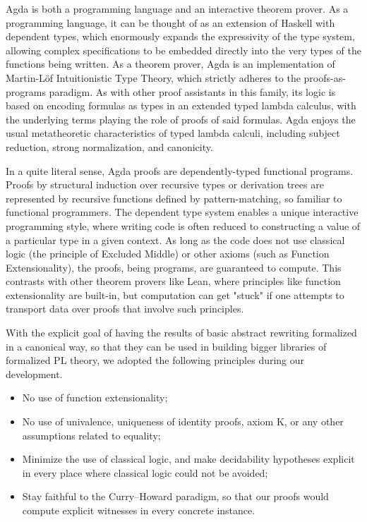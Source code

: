 Agda is both a programming language and an interactive theorem prover.
As a programming language, it can be thought of as an extension of Haskell
with dependent types, which enormously expands the expressivity of the type system,
allowing complex specifications to be embedded directly into the
very types of the functions being written.
As a theorem prover, Agda is an implementation of Martin-L\"of
Intuitionistic Type Theory, which strictly adheres to the proofs-as-programs paradigm.
As with other proof assistants in this family, its logic is based on encoding
formulas as types in an extended typed lambda calculus, with the underlying terms
playing the role of proofs of said formulas. Agda enjoys the usual metatheoretic characteristics
of typed lambda calculi, including subject reduction, strong normalization, and canonicity.

In a quite literal sense, Agda proofs are dependently-typed functional programs.
Proofs by structural induction over recursive types or derivation trees are represented by
recursive functions defined by pattern-matching, so familiar to functional programmers.
The dependent type system enables a unique interactive programming style, where
writing code is often reduced to constructing a value of a particular type in a given context. As long as the code does not use classical logic (the principle of Excluded Middle) or
other axioms (such as Function Extensionality), the proofs, being programs,
are guaranteed to compute. %
This contrasts with other theorem provers like Lean, where principles like function extensionality are built-in, but computation can get "stuck" if one attempts to transport data over proofs that involve such principles.

With the explicit goal of having the results of basic abstract rewriting
formalized in a canonical way, so that they can be used in building bigger
libraries of formalized PL theory, we adopted the following
principles during our development.
\begin{itemize}
  \item No use of function extensionality;
  \item No use of univalence, uniqueness of identity proofs, axiom K, or any other
  assumptions related to equality;
  \item Minimize the use of classical logic, and make decidability hypotheses explicit in every place where classical logic could not be avoided;
  \item Stay faithful to the Curry--Howard paradigm, so that our proofs would compute
    explicit witnesses in every concrete instance.
\end{itemize}


